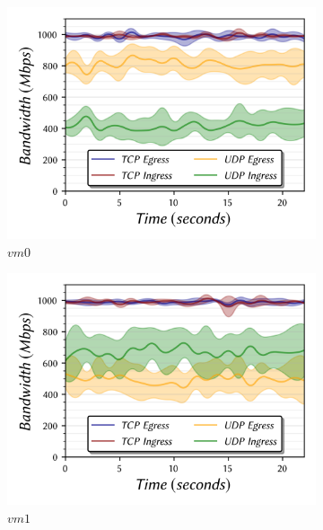 \documentclass[a4paper,10pt]{article}
\begin{document}
\begin{figure}
\centering
\begin{subfigure}{.33\textwidth}
  \centering
  \includegraphics[width=\hsize]{figs/cluster2/setA/vis-5-vm0-combined.png}
  \caption{$vm0$}
  \label{fig:bw-bidir-2:a}
\end{subfigure}%
\hfill%
\begin{subfigure}{.33\textwidth}
  \centering
  \includegraphics[width=\hsize]{figs/cluster2/setA/vis-5-vm1-combined.png}
  \caption{$vm1$}
  \label{fig:bw-bidir-2:b}
\end{subfigure}%
\hfill%
\begin{subfigure}{.33\textwidth}
  \centering

\end{subfigure}
\end{figure}
\end{document}
